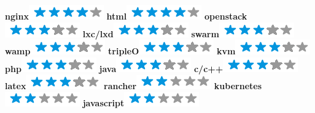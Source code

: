 \documentclass[]{friggeri-cv}
\begin{document}
\begin{aside}
        \textbf{nginx}\includegraphics[scale=0.40]{img/4stars.png}
        \textbf{html}\includegraphics[scale=0.40]{img/4stars.png}
        \textbf{openstack}\includegraphics[scale=0.40]{img/3stars.png}
        \textbf{lxc/lxd}\includegraphics[scale=0.40]{img/3stars.png}
        \textbf{swarm}\includegraphics[scale=0.40]{img/3stars.png}
        \textbf{wamp}\includegraphics[scale=0.40]{img/3stars.png}
        \textbf{tripleO}\includegraphics[scale=0.40]{img/3stars.png}
        \textbf{kvm}\includegraphics[scale=0.40]{img/3stars.png}
        \textbf{php}\includegraphics[scale=0.40]{img/3stars.png}
        \textbf{java}\includegraphics[scale=0.40]{img/3stars.png}
        \textbf{c/c++}\includegraphics[scale=0.40]{img/3stars.png}
        \textbf{latex}\includegraphics[scale=0.40]{img/3stars.png}
        \textbf{rancher}\includegraphics[scale=0.40]{img/2stars.png}
        \textbf{kubernetes}\includegraphics[scale=0.40]{img/2stars.png}
        \textbf{javascript}\includegraphics[scale=0.40]{img/2stars.png}
        ~

\end{aside}
\end{document}
